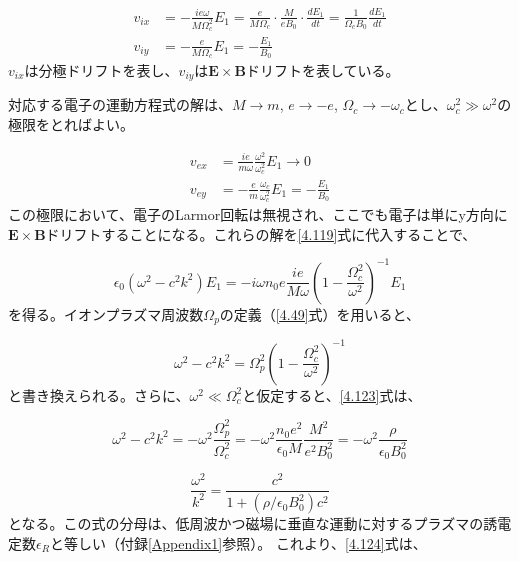 \documentclass{ltjsarticle}
\numberwithin{equation}{section} %
\begin{document}
\begin{equation*}
  \begin{aligned}
    v_{ix} &= -\frac{ie\omega}{M\Omega^2_c}E_1 = \frac{e}{M\Omega_c}\cdot \frac{M}{eB_0}\cdot \frac{dE_1}{dt} = \frac{1}{\Omega_cB_0}\frac{dE_1}{dt}\\
    v_{iy} &= -\frac{e}{M\Omega_c}E_1 = -\frac{E_1}{B_0}
  \end{aligned}
\end{equation*}
$v_{ix}$は分極ドリフトを表し、$v_{iy}$は$\bm{E}\times \bm{B}$ドリフトを表している。

対応する電子の運動方程式の解は、$M\to m$, $e\to -e$, $\Omega_c \to -\omega_c$とし、$\omega^2_c \gg \omega^2$の極限をとればよい。

\begin{equation}
  \begin{aligned}
    v_{ex} &= \frac{ie}{m\omega}\frac{\omega^2}{\omega^2_c}E_1\to 0\\
    v_{ey} &= -\frac{e}{m}\frac{\omega_c}{\omega^2_c}E_1 = -\frac{E_1}{B_0}
  \end{aligned} \label{4.121}
\end{equation}
この極限において、電子のLarmor回転は無視され、ここでも電子は単にy方向に$\bm{E}\times \bm{B}$ドリフトすることになる。これらの解を\eqref{4.119}式に代入することで、

\begin{equation}
  \epsilon_0(\omega^2 - c^2k^2)E_1 = -i\omega n_0e\frac{ie}{M\omega}\left(1 - \frac{\Omega^2_c}{\omega^2}\right)^{-1}E_1 \label{4.122}
\end{equation}
を得る。イオンプラズマ周波数$\Omega_p$の定義（\eqref{4.49}式）を用いると、

\begin{equation}
  \omega^2 - c^2k^2 = \Omega^2_p\left(1 - \frac{\Omega^2_c}{\omega^2}\right)^{-1} \label{4.123}
\end{equation}
と書き換えられる。さらに、$\omega^2 \ll \Omega^2_c$と仮定すると、\eqref{4.123}式は、

\[
  \omega^2 - c^2k^2 = -\omega^2\frac{\Omega^2_p}{\Omega^2_c} = -\omega^2\frac{n_0e^2}{\epsilon_0M}\frac{M^2}{e^2B^2_0} = -\omega^2\frac{\rho}{\epsilon_0B^2_0}
\]

\begin{equation}
  \frac{\omega^2}{k^2} = \frac{c^2}{1 + (\rho/\epsilon_0B^2_0)c^2} \label{4.124}  
\end{equation}
となる。この式の分母は、低周波かつ磁場に垂直な運動に対するプラズマの誘電定数$\epsilon_R$と等しい（付録\ref{Appendix1}参照）。
これより、\eqref{4.124}式は、
\end{document}
